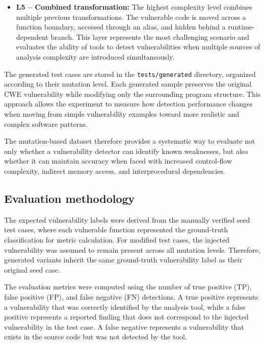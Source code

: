 \documentclass[11pt,a4paper]{article}
\begin{document}
\begin{itemize}
    \item \textbf{L5 -- Combined transformation:}
    The highest complexity level combines multiple previous transformations. The vulnerable code is moved across a function boundary, accessed through an alias, and hidden behind a runtime-dependent branch. This layer represents the most challenging scenario and evaluates the ability of tools to detect vulnerabilities when multiple sources of analysis complexity are introduced simultaneously.

\end{itemize}

The generated test cases are stored in the \texttt{tests/generated} directory, organized according to their mutation level. Each generated sample preserves the original CWE vulnerability while modifying only the surrounding program structure. This approach allows the experiment to measure how detection performance changes when moving from simple vulnerability examples toward more realistic and complex software patterns.

The mutation-based dataset therefore provides a systematic way to evaluate not only whether a vulnerability detector can identify known weaknesses, but also whether it can maintain accuracy when faced with increased control-flow complexity, indirect memory access, and interprocedural dependencies.

\subsection{Evaluation methodology}

The expected vulnerability labels were derived from the manually verified seed
test cases, where each vulnerable function represented the ground-truth
classification for metric calculation. For modified test cases, the injected vulnerability was assumed to remain
present across all mutation levels. Therefore, generated variants inherit the
same ground-truth vulnerability label as their original seed case.

The evaluation metrics were computed using the number of true positive (TP),
false positive (FP), and false negative (FN) detections. A true positive
represents a vulnerability that was correctly identified by the analysis tool,
while a false positive represents a reported finding that does not correspond
to the injected vulnerability in the test case. A false negative represents a
vulnerability that exists in the source code but was not detected by the tool.
\end{document}
